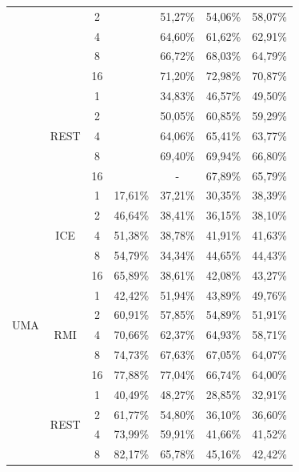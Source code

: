 \begin{table}[H]
{\begin{tabular}{|c|c|c|c|c|c|c|}
			&  & 2 &  & 51,27\% & 54,06\% & 58,07\%   \\ \cline{3-3} \cline{5-7} 
			&  & 4 &  & 64,60\% & 61,62\% & 62,91\% \\ \cline{3-3} \cline{5-7} 
			&  & 8 &  & 66,72\% & 68,03\% & 64,79\%  \\ \cline{3-3} \cline{5-7} 
			&  & 16 &  & 71,20\% & 72,98\% & 70,87\% \\ \cline{2-3} \cline{5-7} 
			& \multirow{5}{*}{REST} & 1 &  & 34,83\% & 46,57\% & 49,50\% \\ \cline{3-3} \cline{5-7} 
			&  & 2 &  & 50,05\% & 60,85\% & 59,29\%  \\ \cline{3-3} \cline{5-7} 
			&  & 4 &  & 64,06\% & 65,41\% & 63,77\% \\ \cline{3-3} \cline{5-7} 
			&  & 8 &  & 69,40\% & 69,94\% & 66,80\%  \\ \cline{3-3} \cline{5-7} 
			&  & 16 &  & - & 67,89\% & 65,79\%  \\ \hline
			\multirow{14}{*}{UMA} & \multirow{5}{*}{ICE} & 1 & 17,61\% & 37,21\% & 30,35\% & 38,39\%  \\ \cline{3-7} 
			&  & 2 & 46,64\% & 38,41\% & 36,15\% & 38,10\%  \\ \cline{3-7} 
			&  & 4 & 51,38\% & 38,78\% & 41,91\% & 41,63\%  \\ \cline{3-7} 
			&  & 8 & 54,79\% & 34,34\% & 44,65\% & 44,43\%  \\ \cline{3-7} 
			&  & 16 & 65,89\% & 38,61\% & 42,08\% & 43,27\%  \\ \cline{2-7} 
			& \multirow{5}{*}{RMI} & 1 & 42,42\% & 51,94\% & 43,89\% & 49,76\%  \\ \cline{3-7} 
			&  & 2 & 60,91\% & 57,85\% & 54,89\% & 51,91\% \\ \cline{3-7} 
			&  & 4 & 70,66\% & 62,37\% & 64,93\% & 58,71\% \\ \cline{3-7} 
			&  & 8 & 74,73\% & 67,63\% & 67,05\% & 64,07\%  \\ \cline{3-7} 
			&  & 16 & 77,88\% & 77,04\% & 66,74\% & 64,00\%  \\ \cline{2-7} 
			& \multirow{4}{*}{REST} & 1 & 40,49\% & 48,27\% & 28,85\% & 32,91\% \\ \cline{3-7} 
			&  & 2 & 61,77\% & 54,80\% & 36,10\% & 36,60\%  \\ \cline{3-7} 
			&  & 4 & 73,99\% & 59,91\% & 41,66\% & 41,52\%  \\ \cline{3-7} 
			&  & 8 & 82,17\% & 65,78\% & 45,16\% & 42,42\%  \\ \hline
		\end{tabular}%
	}
\end{table}

